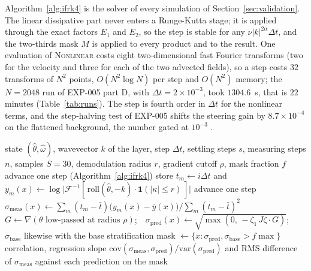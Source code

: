 \documentclass[11pt]{article}
\theoremstyle{remark}
\newcommand{\ev}[1]{\hspace{0.2em}{\small\textsf{[#1]}}}
\begin{document}
Algorithm~\ref{alg:ifrk4} is the solver of every simulation of Section~\ref{sec:validation}. The linear
dissipative part never enters a Runge-Kutta stage; it is applied through the exact factors $E_{1}$ and
$E_{2}$, so the step is stable for any $\nu|k|^{2\alpha}\Delta t$, and the two-thirds mask $M$ is applied to
every product and to the result. One evaluation of \textsc{Nonlinear} costs eight two-dimensional fast
Fourier transforms (two for the velocity and three for each of the two advected fields), so a step costs
$32$ transforms of $N^{2}$ points, $O(N^{2}\log N)$ per step and $O(N^{2})$ memory; the
$N=2048$ run of EXP-005 part D, with $\Delta t=2\times10^{-3}$, took $1304.6$~s, that is $22$ minutes
(Table~\ref{tab:runs}). The step is fourth order in $\Delta t$ for the nonlinear terms, and the
step-halving test of EXP-005 shifts the steering gain by $8.7\times10^{-4}$ on the flattened background, the
number gated at $10^{-3}$ \ev{MV}.

\begin{algorithm}[t]
\caption{Local growth-rate field of a wave and its comparison with the two predictions (EXP-004, EXP-005).}\label{alg:rate}
\begin{algorithmic}[1]
\Require state $(\hat\theta,\hat\omega)$, wavevector $k$ of the layer, step $\Delta t$, settling steps $s$, measuring steps $n$, samples $S=30$, demodulation radius $r$, gradient cutoff $\rho$, mask fraction $f$
 \State advance one step (Algorithm~\ref{alg:ifrk4}) \EndFor {}
   \State store $t_{m}\gets i\Delta t$ and $y_{m}(x)\gets\log\bigl|\mathcal F^{-1}[\,\mathrm{roll}(\hat\theta,-k)\cdot\mathbf 1(|\kappa|\le r)\,]\bigr|$ \EndIf
  \State advance one step
\EndFor
\State $\sigma_{\mathrm{meas}}(x)\gets\sum_{m}(t_{m}-\bar t)\bigl(y_{m}(x)-\bar y(x)\bigr)\big/\sum_{m}(t_{m}-\bar t)^{2}$
\State $G\gets\nabla(\theta\text{ low-passed at radius }\rho)$;\ \ $\sigma_{\mathrm{pred}}(x)\gets\sqrt{\max(0,\,-\zeta_{1}\,J\zeta\cdot G)}$; $\sigma_{\mathrm{base}}$ likewise with the base stratification
\State mask $\gets\{x:\sigma_{\mathrm{pred}},\sigma_{\mathrm{base}}>f\max\}$
\State \Return correlation, regression slope $\mathrm{cov}(\sigma_{\mathrm{meas}},\sigma_{\mathrm{pred}})/\mathrm{var}(\sigma_{\mathrm{pred}})$ and RMS difference of $\sigma_{\mathrm{meas}}$ against each prediction on the mask
\end{algorithmic}
\end{algorithm}
\end{document}
